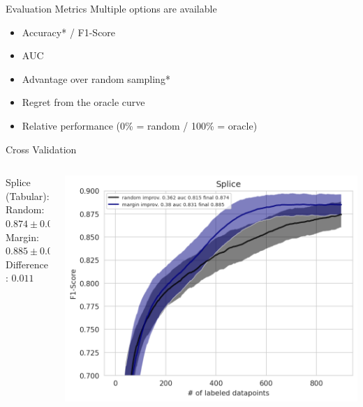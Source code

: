 \documentclass[aspectratio=169, 11pt, invertlogo]{ismll-slides}
\begin{document}

\begin{frame}[fragile]{Evaluation Metrics}
	Multiple options are available
	\begin{itemize}
		\item Accuracy* / F1-Score
		\item AUC
		\item Advantage over random sampling*
		\item Regret from the oracle curve
		\item Relative performance (0\% = random / 100\% = oracle)
	\end{itemize}
\end{frame}


\begin{frame}[fragile]{Cross Validation}
	\begin{columns}
		\begin{column}{0.3\linewidth}
			Splice (Tabular): \\
			Random: $0.874 \pm 0.01$ \\
			Margin: $0.885 \pm 0.015$ \\
			Difference: $0.011$
		\end{column}
		\hspace{3mm}
		\begin{column}{0.7\linewidth}
			\includegraphics[width=0.9\linewidth]{pics/splice_performance.png}
		\end{column}
	\end{columns}
\end{frame}
\end{document}

